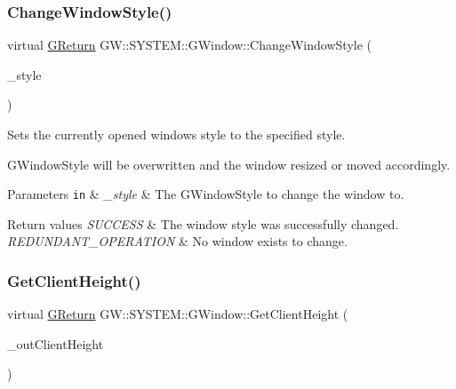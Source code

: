 \subsubsection{\texorpdfstring{Change\+Window\+Style()}{ChangeWindowStyle()}}
{\footnotesize\ttfamily virtual \mbox{\hyperlink{namespaceGW_a67a839e3df7ea8a5c5686613a7a3de21}{G\+Return}} G\+W\+::\+S\+Y\+S\+T\+E\+M\+::\+G\+Window\+::\+Change\+Window\+Style (\begin{DoxyParamCaption}\item[{\mbox{\hyperlink{namespaceGW_1_1SYSTEM_ad117891e556631f842625c348d36a071}{G\+Window\+Style}}}]{\+\_\+style }\end{DoxyParamCaption})\hspace{0.3cm}{\ttfamily [pure virtual]}}



Sets the currently opened window\textquotesingle{}s style to the specified style. 

G\+Window\+Style will be overwritten and the window resized or moved accordingly.


\begin{DoxyParams}[1]{Parameters}
\mbox{\tt in}  & {\em \+\_\+style} & The G\+Window\+Style to change the window to.\\
\hline
\end{DoxyParams}

\begin{DoxyRetVals}{Return values}
{\em S\+U\+C\+C\+E\+SS} & The window style was successfully changed. \\
\hline
{\em R\+E\+D\+U\+N\+D\+A\+N\+T\+\_\+\+O\+P\+E\+R\+A\+T\+I\+ON} & No window exists to change. \\
\hline
\end{DoxyRetVals}
\mbox{\label{classGW_1_1SYSTEM_1_1GWindow_aca175a29d6e87e4d4ed848325216c8f1}} 
\subsubsection{\texorpdfstring{Get\+Client\+Height()}{GetClientHeight()}}
{\footnotesize\ttfamily virtual \mbox{\hyperlink{namespaceGW_a67a839e3df7ea8a5c5686613a7a3de21}{G\+Return}} G\+W\+::\+S\+Y\+S\+T\+E\+M\+::\+G\+Window\+::\+Get\+Client\+Height (\begin{DoxyParamCaption}\item[{unsigned int \&}]{\+\_\+out\+Client\+Height }\end{DoxyParamCaption})\hspace{0.3cm}{\ttfamily [pure virtual]}}




